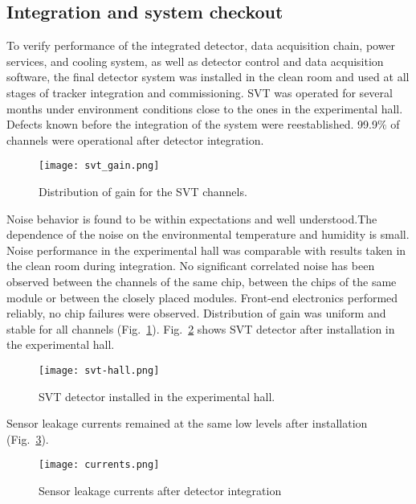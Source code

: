 \subsection{Integration and system checkout}

To verify performance of the integrated detector, data acquisition chain, power services, and cooling system, as well as detector control and data acquisition software, the final detector system was installed in the clean room and used at all stages of tracker integration and commissioning. SVT was operated for several months under environment conditions close to the ones in the experimental hall. Defects known before the integration of the system were reestablished. 99.9$\%$ of channels were operational after detector integration. 

\begin{figure}[hbt] 
\centering 
\texttt{[image: svt\_gain.png]}
\caption{Distribution of gain for the SVT channels.}
\label{fig:svt_gain}
\end{figure}

Noise behavior is found to be within expectations and well understood.The dependence of the noise on the environmental temperature and humidity is small. Noise performance in the experimental hall was comparable with results taken in the clean room during integration. No significant correlated noise has been observed between the channels of the same chip, between the chips of the same module or between the closely placed modules. Front-end electronics performed reliably, no chip failures were observed. Distribution of gain was uniform and stable for all channels (Fig.~\ref{fig:svt_gain}). Fig.~\ref{fig:svt-hall} shows SVT detector after installation in the experimental hall. 
 
\begin{figure}[hbt] 
\centering 
\texttt{[image: svt-hall.png]}
\caption{SVT detector installed in the experimental hall.}
\label{fig:svt-hall}
\end{figure}

Sensor leakage currents remained at the same low levels after installation (Fig.~\ref{fig:currents}).

\begin{figure}[hbt] 
\centering 
\texttt{[image: currents.png]}
\caption{Sensor leakage currents after detector integration}
\label{fig:currents}
\end{figure}


